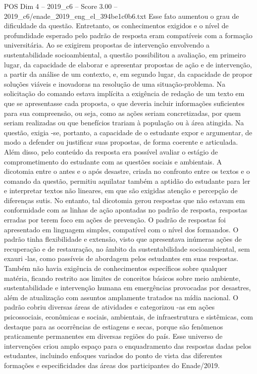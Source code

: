 \begin{textsample}{POS Dim 4 – 2019\_c6 – Score 3.00 – 2019\_c6/enade\_2019\_eng\_el\_394be1c0b6.txt}
Esse fato aumentou o grau de dificuldade da questão.
Entretanto, os conhecimentos exigidos e o nível de profundidade esperado pelo padrão de resposta eram compatíveis com a formação universitária.
Ao se exigirem propostas de intervenção envolvendo a sustentabilidade socioambiental, a questão possibilitou a avaliação, em primeiro lugar, da capacidade de elaborar e apresentar propostas de ação e de intervenção, a partir da análise de um contexto, e, em segundo lugar, da capacidade de propor soluções viáveis e inovadoras na resolução de uma situação-problema.
Na solicitação do comando estava implícita a exigência de redação de um texto em que se apresentasse cada proposta, o que deveria incluir informações suficientes para sua compreensão, ou seja, como as ações seriam concretizadas, por quem seriam realizadas ou que benefícios trariam à população ou à área atingida.
Na questão, exigia -se, portanto, a capacidade de o estudante expor e argumentar, de modo a defender ou justificar suas propostas, de forma coerente e articulada.
Além disso, pelo conteúdo da resposta era possível avaliar o estágio de comprometimento do estudante com as questões sociais e ambientais.
A dicotomia entre o antes e o após desastre, criada no confronto entre os textos e o comando da questão, permitiu aquilatar também a aptidão do estudante para ler e interpretar textos não lineares, em que são exigidas atenção e percepção de diferenças sutis.
No entanto, tal dicotomia gerou respostas que não estavam em conformidade com as linhas de ação apontadas no padrão de resposta, respostas erradas por terem foco em ações de prevenção.
O padrão de respostas foi apresentado em linguagem simples, compatível com o nível dos formandos.
O padrão tinha flexibilidade e extensão, visto que apresentava inúmeras ações de recuperação e de restauração, no âmbito da sustentabilidade socioambiental, sem exauri -las, como passíveis de abordagem pelos estudantes em suas respostas.
Também não havia exigência de conhecimentos específicos sobre qualquer matéria, ficando restrito aos limites de conceitos básicos sobre meio ambiente, sustentabilidade e intervenção humana em emergências provocadas por desastres, além de atualização com assuntos amplamente tratados na mídia nacional.
O padrão cobriu diversas áreas de atividades e categorizou -as em ações psicossociais, econômicas e sociais, ambientais, de infraestrutura e sistêmicas, com destaque para as ocorrências de estiagens e secas, porque são fenômenos praticamente permanentes em diversas regiões do país.
Esse universo de intervenções criou amplo espaço para o enquadramento das respostas dadas pelos estudantes, incluindo enfoques variados do ponto de vista das diferentes formações e especificidades das áreas dos participantes do Enade/2019.

\end{textsample}
